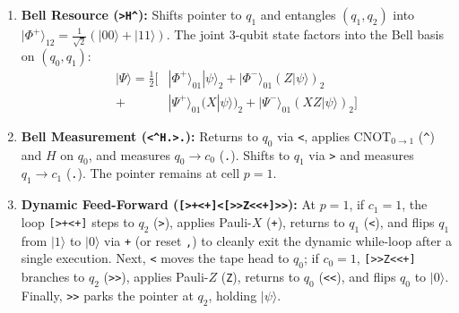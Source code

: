 \documentclass[11pt,a4paper,twocolumn]{article}
\newcommand{\ket}[1]{| #1 \rangle}
\begin{document}
\begin{enumerate}
    \item \textbf{Bell Resource (\texttt{>H\^{}}):} Shifts pointer to $q_1$ and entangles $(q_1, q_2)$ into $\ket{\Phi^+}_{12} = \frac{1}{\sqrt{2}}(\ket{00} + \ket{11})$. The joint 3-qubit state factors into the Bell basis on $(q_0, q_1)$:
    \begin{equation}
    \begin{aligned}
        \ket{\Psi} = \frac{1}{2} \Big[ &\ket{\Phi^+}_{01} \ket{\psi}_2 + \ket{\Phi^-}_{01} (Z\ket{\psi})_2 \\
        + &\ket{\Psi^+}_{01} (X\ket{\psi})_2 + \ket{\Psi^-}_{01} (XZ\ket{\psi})_2 \Big]
    \end{aligned}
    \end{equation}
    \item \textbf{Bell Measurement (\texttt{<\^{}H.>.}):} Returns to $q_0$ via \texttt{<}, applies $\text{CNOT}_{0\to 1}$ (\texttt{\^{}}) and $H$ on $q_0$, and measures $q_0 \to c_0$ (\texttt{.}). Shifts to $q_1$ via \texttt{>} and measures $q_1 \to c_1$ (\texttt{.}). The pointer remains at cell $p = 1$.
    \item \textbf{Dynamic Feed-Forward (\texttt{[>+<+]<[>>Z<<+]>>}):} At $p = 1$, if $c_1 = 1$, the loop \texttt{[>+<+]} steps to $q_2$ (\texttt{>}), applies Pauli-$X$ (\texttt{+}), returns to $q_1$ (\texttt{<}), and flips $q_1$ from $\ket{1}$ to $\ket{0}$ via \texttt{+} (or reset \texttt{,}) to cleanly exit the dynamic while-loop after a single execution. Next, \texttt{<} moves the tape head to $q_0$; if $c_0 = 1$, \texttt{[>>Z<<+]} branches to $q_2$ (\texttt{>>}), applies Pauli-$Z$ (\texttt{Z}), returns to $q_0$ (\texttt{<<}), and flips $q_0$ to $\ket{0}$. Finally, \texttt{>>} parks the pointer at $q_2$, holding $\ket{\psi}$.
\end{enumerate}
\end{document}
